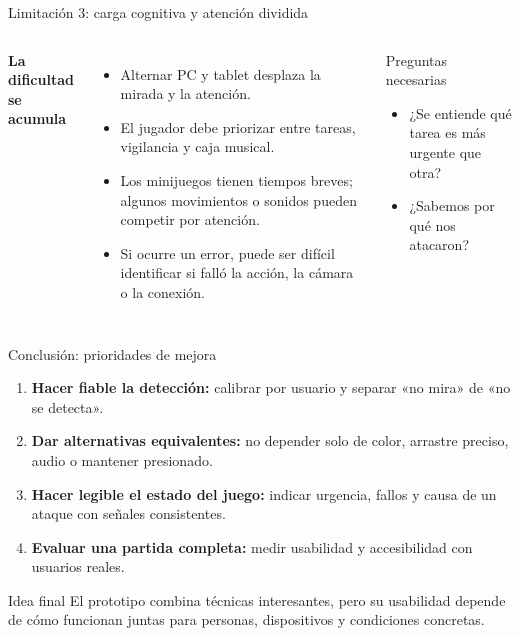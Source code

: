 \documentclass[aspectratio=169,11pt]{beamer}
\newcommand{\tagline}[1]{{\color{Teal}\bfseries\small #1}}
\newcommand{\strong}[1]{{\color{Navy}\bfseries #1}}
\begin{document}
\begin{frame}{Limitación 3: carga cognitiva y atención dividida}
  \begin{columns}[T,onlytextwidth]
      \tagline{La dificultad se acumula}
      \begin{itemize}
        \item Alternar PC y tablet desplaza la mirada y la atención.
        \item El jugador debe priorizar entre tareas, vigilancia y caja musical.
        \item Los minijuegos tienen tiempos breves; algunos movimientos o sonidos pueden competir por atención.
        \item Si ocurre un error, puede ser difícil identificar si falló la acción, la cámara o la conexión.
      \end{itemize}
      \begin{block}{Preguntas necesarias}
        \begin{itemize}
          \item ¿Se entiende qué tarea es más urgente que otra?
          \item ¿Sabemos por qué nos atacaron?
        \end{itemize}
      \end{block}
  \end{columns}
\end{frame}


\begin{frame}{Conclusión: prioridades de mejora}
  \begin{enumerate}
    \item \strong{Hacer fiable la detección:} calibrar por usuario y separar «no mira» de «no se detecta».
    \item \strong{Dar alternativas equivalentes:} no depender solo de color, arrastre preciso, audio o mantener presionado.
    \item \strong{Hacer legible el estado del juego:} indicar urgencia, fallos y causa de un ataque con señales consistentes.
    \item \strong{Evaluar una partida completa:} medir usabilidad y accesibilidad con usuarios reales.
  \end{enumerate}
  \vspace{.65em}
  \begin{block}{Idea final}
    El prototipo combina técnicas interesantes, pero su usabilidad depende de cómo funcionan juntas para personas, dispositivos y condiciones concretas.
  \end{block}
\end{frame}
\end{document}
